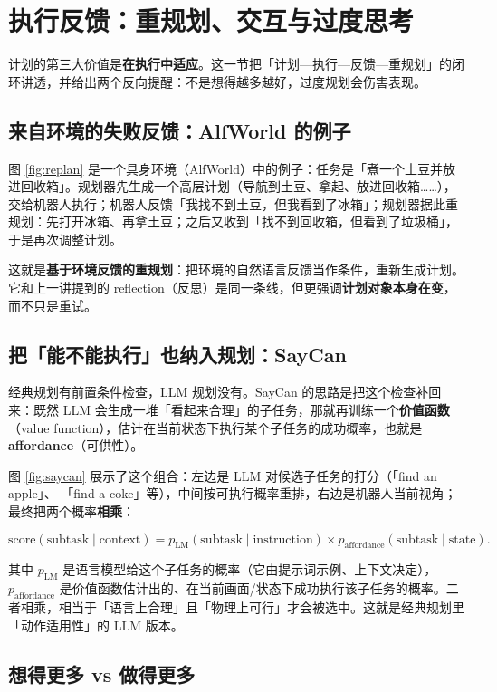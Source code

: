 \documentclass[a4paper]{article}
\begin{document}
\section{执行反馈：重规划、交互与过度思考}

计划的第三大价值是\textbf{在执行中适应}。这一节把「计划—执行—反馈—重规划」的闭环讲透，并给出两个反向提醒：不是想得越多越好，过度规划会伤害表现。

\subsection{来自环境的失败反馈：AlfWorld 的例子}

图 \ref{fig:replan} 是一个具身环境（AlfWorld）中的例子：任务是「煮一个土豆并放进回收箱」。规划器先生成一个高层计划（导航到土豆、拿起、放进回收箱……），交给机器人执行；机器人反馈「我找不到土豆，但我看到了冰箱」；规划器据此重规划：先打开冰箱、再拿土豆；之后又收到「找不到回收箱，但看到了垃圾桶」，于是再次调整计划。

这就是\textbf{基于环境反馈的重规划}：把环境的自然语言反馈当作条件，重新生成计划。它和上一讲提到的 reflection（反思）是同一条线，但更强调\textbf{计划对象本身在变}，而不只是重试。

\subsection{把「能不能执行」也纳入规划：SayCan}

经典规划有前置条件检查，LLM 规划没有。SayCan 的思路是把这个检查补回来：既然 LLM 会生成一堆「看起来合理」的子任务，那就再训练一个\textbf{价值函数}（value function），估计在当前状态下执行某个子任务的成功概率，也就是\textbf{affordance}（可供性）。

图 \ref{fig:saycan} 展示了这个组合：左边是 LLM 对候选子任务的打分（「find an apple」、 「find a coke」等），中间按可执行概率重排，右边是机器人当前视角；最终把两个概率\textbf{相乘}：

$$
\text{score}(\text{subtask} \mid \text{context}) =
p_{\text{LM}}(\text{subtask} \mid \text{instruction}) \times
p_{\text{affordance}}(\text{subtask} \mid \text{state}).
$$

其中 $p_{\text{LM}}$ 是语言模型给这个子任务的概率（它由提示词示例、上下文决定），$p_{\text{affordance}}$ 是价值函数估计出的、在当前画面/状态下成功执行该子任务的概率。二者相乘，相当于「语言上合理」且「物理上可行」才会被选中。这就是经典规划里「动作适用性」的 LLM 版本。

\subsection{想得更多 vs 做得更多}
\end{document}
